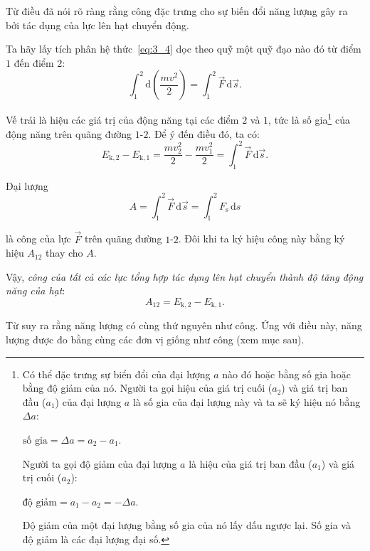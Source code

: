 \noindent
Từ điều đã nói rõ ràng rằng công đặc trưng cho sự biến đổi năng lượng gây ra bởi tác dụng của lực lên hạt chuyển động.

Ta hãy lấy tích phân hệ thức~\eqref{eq:3_4} dọc theo quỹ một quỹ đạo nào đó từ điểm $1$ đến điểm $2$:
\begin{equation*}
\int_{1}^{2} \mathrm{d}\!\left(\frac{mv^2}{2}\right) = \int_{1}^{2} \vec{F}\,\mathrm{d}\vec{s}.
\end{equation*}

\noindent
Vế trái là hiệu các giá trị của động năng tại các điểm $2$ và $1$, tức là số gia\footnote{Có thể đặc trưng sự biển đổi của đại lượng $a$ nào đó hoặc bằng số gia hoặc bằng độ giảm của nó. Người ta gọi hiệu của giá trị cuối ($a_2$) và giá trị ban đầu ($a_1$) của đại lượng $a$ là số gia của đại lượng này và ta sẽ ký hiệu nó bằng $\Delta a$: 

$\text{số gia}=\Delta a=a_2-a_1$. 

Người ta gọi độ giảm của đại lượng $a$ là hiệu của giá trị ban đầu ($a_1$) và giá trị cuối ($a_2$): 

$\text{độ giảm}=a_1-a_2=-\Delta a$. 

Độ giảm của một đại lượng bằng số gia của nó lấy dấu ngược lại. Số gia và độ giảm là các đại lượng đại số.} của động năng trên quãng đường $1$-$2$. Để ý đến điều đó, ta có:
\begin{equation}\label{eq:3_9}
E_{\text{k},2} - E_{\text{k},1} = \frac{mv^2_2}{2} - \frac{mv^2_1}{2} = \int_{1}^{2} \vec{F}\,\mathrm{d}\vec{s}.
\end{equation}

Đại lượng 
\begin{equation}\label{eq:3_10}
A = \int_{1}^{2} \vec{F}\,\mathrm{d}\vec{s} = \int_{1}^{2} F_{\text{s}}\,\mathrm{d}s
\end{equation}

\noindent
là công của lực $\vec{F}$ trên quãng đường $1$-$2$. Đôi khi ta ký hiệu công này bằng ký hiệu $A_{12}$ thay cho $A$.

Vậy, \textit{công của tất cả các lực tổng hợp tác dụng lên hạt chuyển thành độ tăng động năng của hạt}:
\begin{equation}\label{eq:3_11}
A_{12} = E_{\text{k},2} - E_{\text{k},1}.
\end{equation}

\noindent
Từ  suy ra rằng năng lượng có cùng thứ nguyên như công. Ứng với điều này, năng lượng được đo bằng cùng các đơn vị giống như công (xem mục sau).


